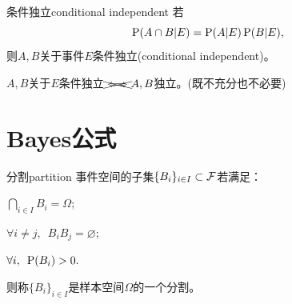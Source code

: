 \begin{definition}{条件独立}{conditional independent}
	若
	\[
		\P(A\cap B|E)=\P(A|E)\P(B|E),
	\]
	则$A,B$关于事件$E$条件独立(conditional independent)。
\end{definition}

\begin{remark}
	$A,B$关于$E$条件独立$\xcancel{\iff}A,B$独立。(既不充分也不必要)
\end{remark}

\section{Bayes公式}

\begin{definition}
	{分割}{partition}
	事件空间的子集$\{B_i\}_{i\in I}\subset\cF$若满足：
	\begin{compactenum}
		\item $\bigcap\nolimits_{i\in I} B_i=\Omega;$
		\item $\forall i\neq j,\enspace B_iB_j=\varnothing;$
		\item $\forall i,\enspace\P(B_i)>0.$
	\end{compactenum}
	则称$\{B_i\}_{i\in I}$是样本空间$\Omega$的一个分割。
\end{definition}

